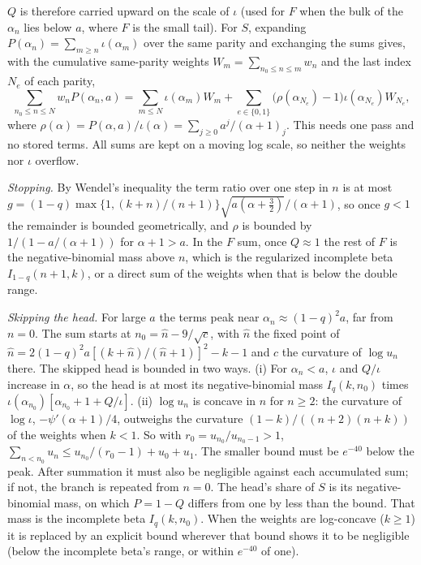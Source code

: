 \documentclass[12pt]{article}
\begin{document}
$Q$ is therefore carried upward on the scale of $\iota$ (used for $F$ when the bulk of the $\alpha_n$ lies below $a$, where $F$ is the small tail). For $S$, expanding $P(\alpha_n)=\sum_{m\ge n}\iota(\alpha_m)$ over the same parity and exchanging the sums gives, with the cumulative same-parity weights $W_m=\sum_{n_0\le n\le m}w_n$ and the last index $N_e$ of each parity,
\begin{equation}
  \sum_{n_0\le n\le N}w_nP(\alpha_n,a)=\sum_{m\le N}\iota(\alpha_m)W_m
  +\sum_{e\in\{0,1\}}\bigl(\rho(\alpha_{N_e})-1\bigr)\iota(\alpha_{N_e})W_{N_e},
\end{equation}
where $\rho(\alpha)=P(\alpha,a)/\iota(\alpha)=\sum_{j\ge0}a^j/(\alpha+1)_j$. This needs one pass and no stored terms. All sums are kept on a moving log scale, so neither the weights nor $\iota$ overflow.

\emph{Stopping.} By Wendel's inequality the term ratio over one step in $n$ is at most $g=(1-q)\max\{1,(k+n)/(n+1)\}\sqrt{a(\alpha+\tfrac32)}/(\alpha+1)$, so once $g<1$ the remainder is bounded geometrically, and $\rho$ is bounded by $1/(1-a/(\alpha+1))$ for $\alpha+1>a$. In the $F$ sum, once $Q\approx1$ the rest of $F$ is the negative-binomial mass above $n$, which is the regularized incomplete beta $I_{1-q}(n+1,k)$, or a direct sum of the weights when that is below the double range.

\emph{Skipping the head.} For large $a$ the terms peak near $\alpha_n\approx(1-q)^2a$, far from $n=0$. The sum starts at $n_0=\hat n-9/\sqrt{c}$, with $\hat n$ the fixed point of $\hat n=2(1-q)^2a[(k+\hat n)/(\hat n+1)]^2-k-1$ and $c$ the curvature of $\log u_n$ there. The skipped head is bounded in two ways. (i) For $\alpha_n<a$, $\iota$ and $Q/\iota$ increase in $\alpha$, so the head is at most its negative-binomial mass $I_q(k,n_0)$ times $\iota(\alpha_{n_0})[\alpha_{n_0}+1+Q/\iota]$. (ii) $\log u_n$ is concave in $n$ for $n\ge2$: the curvature of $\log\iota$, $-\psi'(\alpha+1)/4$, outweighs the curvature $(1-k)/((n+2)(n+k))$ of the weights when $k<1$. So with $r_0=u_{n_0}/u_{n_0-1}>1$, $\sum_{n<n_0}u_n\le u_{n_0}/(r_0-1)+u_0+u_1$. The smaller bound must be $e^{-40}$ below the peak. After summation it must also be negligible against each accumulated sum; if not, the branch is repeated from $n=0$. The head's share of $S$ is its negative-binomial mass, on which $P=1-Q$ differs from one by less than the bound. That mass is the incomplete beta $I_q(k,n_0)$. When the weights are log-concave ($k\ge1$) it is replaced by an explicit bound wherever that bound shows it to be negligible (below the incomplete beta's range, or within $e^{-40}$ of one).
\end{document}
